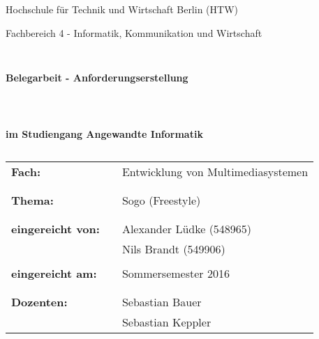 \documentclass[a4paper]{scrartcl}
\begin{document}
\thispagestyle{empty}

%
%

\thispagestyle{empty}
\begin{center}
\Large{Hochschule für Technik und Wirtschaft Berlin (HTW)}\\
\end{center}
 
 
\begin{center}
\Large{Fachbereich 4 - Informatik, Kommunikation und Wirtschaft}
\end{center}
\begin{verbatim}


\end{verbatim}
\begin{center}
\textbf{\LARGE{Belegarbeit - Anforderungserstellung}}
\end{center}
\begin{verbatim}
 
 
\end{verbatim}
\begin{center}
\textbf{im Studiengang Angewandte Informatik}
\end{center}
\begin{verbatim}
\end{verbatim}
 
\begin{flushleft}
\begin{tabular}{lll}
\textbf{Fach:} & & Entwicklung von Multimediasystemen\\
& & \\
& & \\
\textbf{Thema:} & & Sogo (Freestyle)\\
& & \\
& & \\
\textbf{eingereicht von:} & & Alexander Lüdke (548965)\\
& & Nils Brandt (549906)\\
& & \\
\textbf{eingereicht am:} & & Sommersemester 2016 \\
& & \\
& & \\
\textbf{Dozenten:} & & Sebastian Bauer\\
& & Sebastian Keppler \\
\end{tabular}
\end{flushleft}
\end{document}

